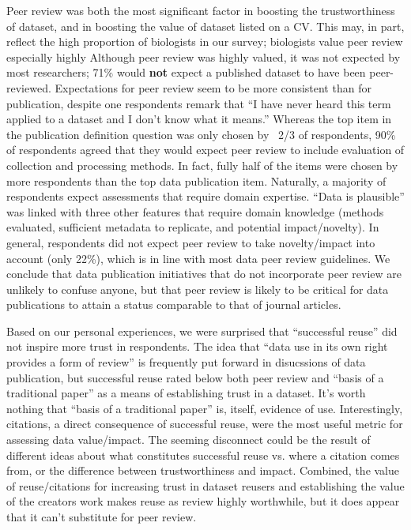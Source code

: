\documentclass[10pt]{article}
\begin{document}
Peer review was both the most significant factor in boosting the trustworthiness of dataset, and in boosting the value of dataset listed on a CV.
This may, in part, reflect the high proportion of biologists in our survey; biologists value peer review especially highly\cite{harley_assessing_2010}
Although peer review was highly valued, it was not expected by most researchers; 71\% would \textbf{not} expect a published dataset to have been peer-reviewed.
Expectations for peer review seem to be more consistent than for publication, despite one respondents remark that ``I have never heard this term applied to a dataset and I don't know what it means.''
Whereas the top item in the publication definition question was only chosen by ~2/3 of respondents, 90\% of respondents agreed that they would expect peer review to include evaluation of collection and processing methods.
In fact, fully half of the items were chosen by more respondents than the top data publication item.
Naturally, a majority of respondents expect assessments that require domain expertise.
``Data is plausible'' was linked with three other features that require domain knowledge (methods evaluated, sufficient metadata to replicate, and potential impact/novelty).
In general, respondents did not expect peer review to take novelty/impact into account (only 22\%), which is in line with most data peer review guidelines.
We conclude that data publication initiatives that do not incorporate peer review are unlikely to confuse anyone, but that peer review is likely to be critical for data publications to attain a status comparable to that of journal articles.

Based on our personal experiences, we were surprised that ``successful reuse'' did not inspire more trust in respondents.
The idea that ``data use in its own right provides a form of review''\cite{parsons_data_2010} is frequently put forward in disucssions of data publication, but successful reuse rated below both peer review and ``basis of a traditional paper'' as a means of establishing trust in a dataset.
It's worth nothing that ``basis of a traditional paper'' is, itself, evidence of use.
Interestingly, citations, a direct consequence of successful reuse, were the most useful metric for assessing data value/impact.
The seeming disconnect could be the result of different ideas about what constitutes successful reuse vs. where a citation comes from, or the difference between trustworthiness and impact.
Combined, the value of reuse/citations for increasing trust in dataset reusers and establishing the value of the creators work makes reuse as review highly worthwhile, but it does appear that it can't substitute for peer review.
\end{document}
